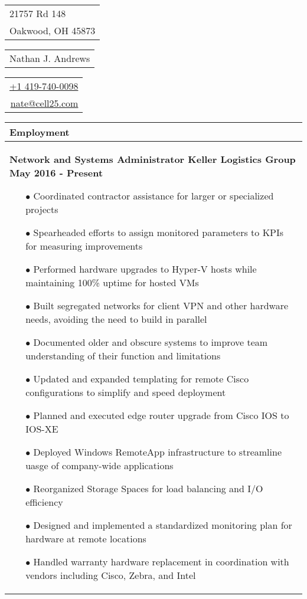 \documentclass{article}
\begin{document}
\sffamily%
{\small\begin{tabular}[c]{l}
  21757 Rd 148 \\
  Oakwood, OH 45873
\end{tabular}}\hfill%
{\Large\bfseries\begin{tabular}[c]{c}
  Nathan J. Andrews
\end{tabular}}\hfill%
{\small\begin{tabular}[c]{r}
  \href{tel:14197400098}{+1 419-740-0098} \\
  \href{mailto:nate@cell25.com}{nate@cell25.com}
\end{tabular}}%

\bigskip

\begin{tabular}{p{\dimexpr\linewidth-2\tabcolsep}}
  \textbf{Employment} \\
  \hline
  {\bfseries Network and Systems Administrator \hfill Keller Logistics Group \qquad \qquad \qquad May 2016 - Present}
	\begin{itemize}
  	\item[$\bullet$]Coordinated contractor assistance for larger or specialized projects
  	\item[$\bullet$]Spearheaded efforts to assign monitored parameters to KPIs for measuring improvements
  	\item[$\bullet$]Performed hardware upgrades to Hyper-V hosts while maintaining 100\% uptime for hosted VMs
  	\item[$\bullet$]Built segregated networks for client VPN and other hardware needs, avoiding the need to build in parallel
  	\item[$\bullet$]Documented older and obscure systems to improve team understanding of their function and limitations
  	\item[$\bullet$]Updated and expanded templating for remote Cisco configurations to simplify and speed deployment
  	\item[$\bullet$]Planned and executed edge router upgrade from Cisco IOS to IOS-XE
  	\item[$\bullet$]Deployed Windows RemoteApp infrastructure to streamline uasge of company-wide applications
  	\item[$\bullet$]Reorganized Storage Spaces for load balancing and I/O efficiency
  	\item[$\bullet$]Designed and implemented a standardized monitoring plan for hardware at remote locations
  	\item[$\bullet$]Handled warranty hardware replacement in coordination with vendors including Cisco, Zebra, and Intel

\end{itemize}
\end{tabular}
\end{document}

